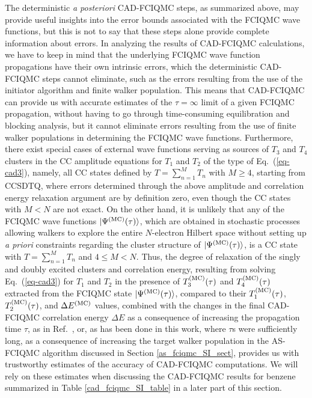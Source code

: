 \documentclass[journal=jcp,manuscript=suppinfo]{achemso}
\begin{document}
The deterministic {\it a posteriori} CAD-FCIQMC steps, as summarized above, may provide useful insights
into the error bounds associated with the FCIQMC wave functions, but this is not to say that these
steps alone provide complete information about errors. In analyzing the results of CAD-FCIQMC calculations,
we have to keep in mind that the underlying FCIQMC
wave function propagations have their own intrinsic errors, which the deterministic
CAD-FCIQMC steps cannot eliminate, such as the errors resulting from the use of the initiator
algorithm and finite walker population. This means that CAD-FCIQMC can provide us with
accurate estimates of the $\tau = \infty$ limit of a given FCIQMC propagation, without
having to go through time-consuming equilibration and blocking analysis, but it cannot
eliminate errors resulting from the use of finite walker populations in determining the
FCIQMC wave functions. Furthermore, there exist special cases of external wave functions
serving as sources of $T_3$ and $T_4$ clusters in the CC amplitude
equations for $T_{1}$ and $T_{2}$ of the type of Eq.\ (\ref{eq-cad3}), namely, all CC states defined by
$T = \sum_{n=1}^{M} T_{n}$ with $M \geq 4$, starting from CCSDTQ,\cite{ccsdtq_paper_1_jcp_1991,ccsdtq_paper_2_jcp_1992}
where errors determined through the above amplitude and correlation energy relaxation argument are by definition zero,
even though the CC states with $M < N$ are not exact. On the other hand,
it is unlikely that any of the FCIQMC wave functions $|\Psi^{\rm (MC)}(\tau)\rangle$, which are obtained
in stochastic processes allowing walkers to explore the entire $N$-electron Hilbert space without setting up
{\it a priori} constraints regarding the cluster structure of $|\Psi^{\rm (MC)}(\tau)\rangle$, is a CC state with
$T = \sum_{n=1}^{M} T_{n}$ and $4 \leq M < N$. Thus, the degree of relaxation of the singly and doubly excited clusters
and correlation energy, resulting from solving Eq.\ (\ref{eq-cad3}) for $T_{1}$ and $T_{2}$ in the presence
of $T_{3}^{\rm (MC)}(\tau)$ and $T_{4}^{\rm (MC)}(\tau)$ extracted
from the FCIQMC state $|\Psi^{\rm (MC)}(\tau)\rangle$,
compared to their $T_{1}^{\rm (MC)}(\tau)$, $T_{2}^{\rm (MC)}(\tau)$, and $\Delta E^{\rm (MC)}$ values,
combined with the changes in the final CAD-FCIQMC correlation energy $\Delta E$ as a consequence of
increasing the propagation time $\tau$, as in Ref.\ , or,
as has been done in this work, where $\tau$s were sufficiently long, as a consequence of increasing the
target walker population in the AS-FCIQMC algorithm discussed in Section \ref{as_fciqmc_SI_sect},
provides us with trustworthy estimates of the accuracy of CAD-FCIQMC computations. We will rely on
these estimates when discussing the CAD-FCIQMC results for benzene summarized in Table \ref{cad_fciqmc_SI_table}
in a later part of this section.
\end{document}
